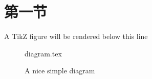 \section{第一节}
    A TikZ figure will be rendered below this line
     
    \begin{figure}[ht]
        \centering
        {diagram.tex}
        \label{fig:tikzexample}
        \caption{A nice simple diagram}
    \end{figure}